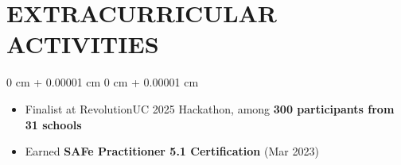 \documentclass[9pt, letterpaper]{article}
\newenvironment{highlights}{
    \begin{itemize}[
        topsep=0.05 cm,
        parsep=0 pt,
        partopsep=0pt,
        itemsep=0pt,
        leftmargin=10pt
    ]
}{
    \end{itemize}
} %
\newenvironment{onecolentry}{
    \begin{adjustwidth}{
        0 cm + 0.00001 cm}{
        0 cm + 0.00001 cm}
}{
    \end{adjustwidth}
} %
\begin{document}
\section{EXTRACURRICULAR ACTIVITIES}

    \begin{onecolentry}
        \begin{highlights}
            \item Finalist at RevolutionUC 2025 Hackathon, among \textbf{300 participants from 31 schools}
            \item Earned \textbf{SAFe Practitioner 5.1 Certification} (Mar 2023)
        \end{highlights}
    \end{onecolentry}
\end{document}
